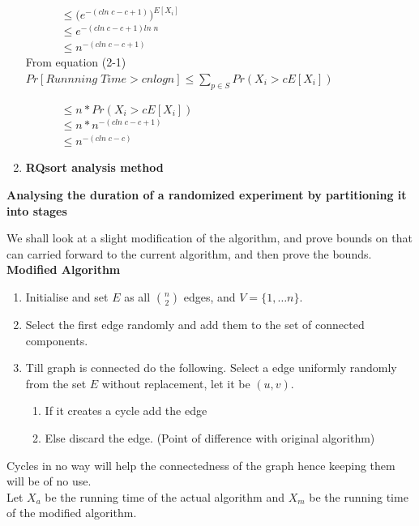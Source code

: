 \documentclass{assignment}
\begin{document}
\begin{problemlist}
\begin{problem}
\begin{enumerate}
\begin{answer}
$\;\;\;\;\;\;\;\;\;\;\;\leq \Bigg(e^{-(cln \; c -c+1)} \Bigg)^{E[X_i]}$\\

$\;\;\;\;\;\;\;\;\;\;\;\leq e^{-(cln \; c -c+1)ln \; n}  $\\

$\;\;\;\;\;\;\;\;\;\;\;\leq n^{-(cln \; c -c+1)}$\\

From equation (2-1)\\

$Pr[Runnning \; Time > c nlogn] \leq \sum_{ p \in S} Pr(X_i > cE[X_i]) $

$\;\;\;\;\;\;\;\;\;\;\;\leq n * Pr(X_i > cE[X_i]) $\\

$\;\;\;\;\;\;\;\;\;\;\;\leq n * n^{-(cln \; c -c+1)}$\\

$\;\;\;\;\;\;\;\;\;\;\;\leq n^{-(cln \; c -c)}$\\
\end{answer}
\item \textbf{RQsort analysis method}\\
\begin{answer} 
\end{answer}
\end{enumerate}
\end{problem}


\pbitem
\begin{problem} 
\textbf{Analysing the duration of a randomized experiment by partitioning it into stages} \\
\begin{answer}

We shall look at a slight modification of the algorithm, and prove bounds on that can carried forward to the current algorithm, and then prove the bounds. \\
\textbf{Modified Algorithm}\\
\begin{enumerate}
 \item Initialise and set $E$ as all $\binom{n}{2}$ edges, and $V = \{ 1, \ldots n \}$.
\item Select the first edge randomly and add them to the set of connected components. 
\item Till graph is connected do the following. Select a edge uniformly randomly from the set $E$ without replacement, let it be $(u,v)$. 
\begin{enumerate}
 \item If it creates a cycle add the edge  
 \item Else discard the edge. (Point of difference with original algorithm)
\end{enumerate}
\end{enumerate}
Cycles in no way will help the connectedness of the graph hence keeping them will be of no use.  \\
Let $X_a$ be the running time of the actual algorithm and $X_m$ be the running time of the modified algorithm.\\


\end{answer}
\end{problem}
\end{problemlist}
\end{document}
